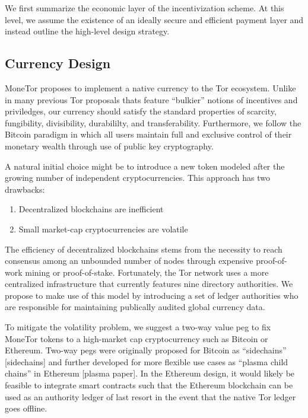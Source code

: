 We first summarize the economic layer of the incentivization scheme. At this
level, we assume the existence of an ideally secure and efficient payment layer
and instead outline the high-level design strategy.

\subsection{Currency Design}

MoneTor proposes to implement a native currency to the Tor ecosystem. Unlike in
many previous Tor proposals thats feature ``bulkier'' notions of incentives and
priviledges, our currency should satisfy the standard properties of scarcity,
fungibility, divisibility, durabililty, and transferability. Furthermore, we
follow the Bitcoin paradigm in which all users maintain full and exclusive
control of their monetary wealth through use of public key cryptography.

A natural initial choice might be to introduce a new token modeled after the
growing number of independent cryptocurrencies. This approach has two drawbacks:

\begin{enumerate}
\item Decentralized blockchains are inefficient
\item Small market-cap cryptocurrencies are volatile
\end{enumerate}

The efficiency of decentralized blockchains stems from the necessity to reach
consensus among an unbounded number of nodes through expensive proof-of-work
mining or proof-of-stake. Fortunately, the Tor network uses a more centralized
infrastructure that currently features nine directory authorities. We propose to
make use of this model by introducing a set of ledger authorities who are
responsible for maintaining publically audited global currency data.

To mitigate the volatility problem, we suggest a two-way value peg to fix
MoneTor tokens to a high-market cap cryptocurrency such as Bitcoin or
Ethereum. Two-way pegs were originally proposed for Bitcoin as ``sidechains''
[sidechains] and further developed for more flexible use cases as ``plasma child
chains'' in Ethereum [plasma paper]. In the Ethereum design, it would likely be
feasible to integrate smart contracts such that the Ethereum blockchain can be
used as an authority ledger of last resort in the event that the native Tor
ledger goes offline.

